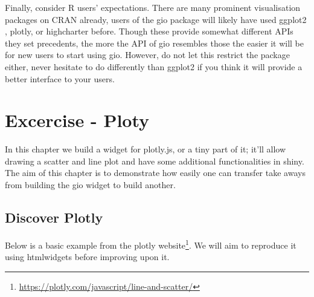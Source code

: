 \documentclass[
]{krantz}
\renewcommand{\href}[2]{#2\footnote{\url{#1}}}
\begin{document}
Finally, consider R users' expectations. There are many prominent visualisation packages on CRAN already, users of the gio package will likely have used ggplot2 \citep{R-ggplot2}, plotly, or highcharter before. Though these provide somewhat different APIs they set precedents, the more the API of gio resembles those the easier it will be for new users to start using gio. However, do not let this restrict the package either, never hesitate to do differently than ggplot2 if you think it will provide a better interface to your users.

\hypertarget{widgets-ex-plotly}{%
\chapter{Excercise - Ploty}\label{widgets-ex-plotly}}

In this chapter we build a widget for plotly.js, or a tiny part of it; it'll allow drawing a scatter and line plot and have some additional functionalities in shiny. The aim of this chapter is to demonstrate how easily one can transfer take aways from building the gio widget to build another.

\hypertarget{widgets-ex-plotly-discover}{%
\section{Discover Plotly}\label{widgets-ex-plotly-discover}}

Below is a basic example from the \href{https://plotly.com/javascript/line-and-scatter/}{plotly website}. We will aim to reproduce it using htmlwidgets before improving upon it.
\end{document}

